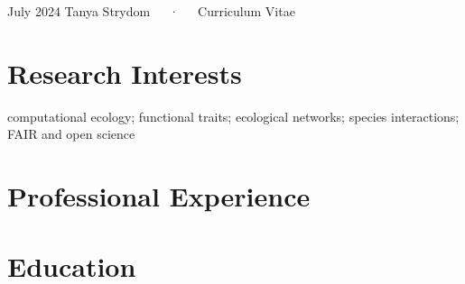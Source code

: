 \documentclass[11pt,a4paper,]{awesome-cv}
\begin{document}
\makecvheader

\makecvfooter
  {July 2024}
    {Tanya Strydom~~~·~~~Curriculum Vitae}
  {\thepage}





\section{\texorpdfstring{ Research
Interests}{ Research Interests}}\label{research-interests}

computational ecology; functional traits; ecological networks; species
interactions; FAIR and open science

\section{\texorpdfstring{ Professional
Experience}{ Professional Experience}}\label{professional-experience}

\begin{cventries}
\end{cventries}

\section{\texorpdfstring{
Education}{ Education}}\label{education}
\end{document}
